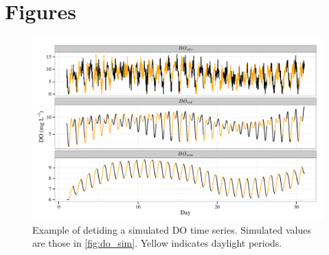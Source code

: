 \documentclass[letterpaper,12pt,oneside]{article}\usepackage[]{graphicx}\usepackage[]{color}
\makeatletter
\def\maxwidth{ %
  \ifdim\Gin@nat@width>\linewidth
    \linewidth
  \else
    \Gin@nat@width
  \fi
}
\newenvironment{knitrout}{}{} %
\makeatother
\begin{document}

\begin{singlespace}


\end{singlespace}
\clearpage


\section{Figures}

\centering\vspace*{\fill}
\begin{knitrout}
\color{fgcolor}\begin{figure}[!ht]


{\centering \includegraphics[width=\maxwidth]{figure/do_dtd} 

}

\caption[Example of detiding a simulated \ac{DO} time series]{Example of detiding a simulated \ac{DO} time series.  Simulated values are those in \cref{fig:do_sim}.  Yellow indicates daylight periods.\label{fig:do_dtd}}
\end{figure}


\end{knitrout}
\vfill
\clearpage
\end{document}
